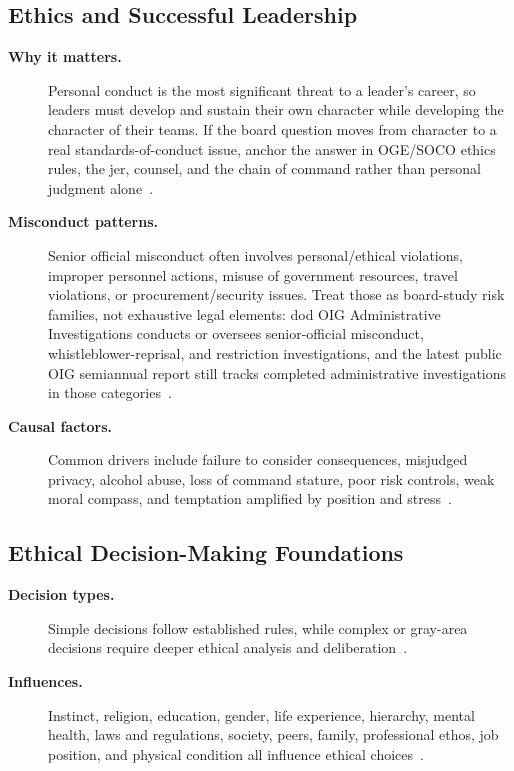 \documentclass[../main.tex]{subfiles}
\begin{document}
\subsection{Ethics and Successful Leadership}
\begin{description}
  \item[\textbf{Why it matters.}] Personal conduct is the most significant threat to a leader's career, so leaders must develop and sustain their own character while developing the character of their teams. If the board question moves from character to a real standards-of-conduct issue, anchor the answer in OGE/SOCO ethics rules, the \ac{jer}, counsel, and the chain of command rather than personal judgment alone~\autocite{edo-5-1-3-ethics-and-acquisition-2025,DoD-SOCO-Ethics-Laws-Regulations-2026,DoD-JER-2024}.
  \item[\textbf{Misconduct patterns.}] Senior official misconduct often involves personal/ethical violations, improper personnel actions, misuse of government resources, travel violations, or procurement/security issues. Treat those as board-study risk families, not exhaustive legal elements: \ac{dod} OIG Administrative Investigations conducts or oversees senior-official misconduct, whistleblower-reprisal, and restriction investigations, and the latest public OIG semiannual report still tracks completed administrative investigations in those categories~\autocite{edo-5-1-3-ethics-and-acquisition-2025,DoW-OIG-Admin-Investigations-2026,DoW-OIG-SAR-Oct2025-Mar2026-2026}.
  \item[\textbf{Causal factors.}] Common drivers include failure to consider consequences, misjudged privacy, alcohol abuse, loss of command stature, poor risk controls, weak moral compass, and temptation amplified by position and stress~\autocite{edo-5-1-3-ethics-and-acquisition-2025}.
\end{description}

\subsection{Ethical Decision-Making Foundations}
\begin{description}
  \item[\textbf{Decision types.}] Simple decisions follow established rules, while complex or gray-area decisions require deeper ethical analysis and deliberation~\autocite{edo-5-1-3-ethics-and-acquisition-2025}.
  \item[\textbf{Influences.}] Instinct, religion, education, gender, life experience, hierarchy, mental health, laws and regulations, society, peers, family, professional ethos, job position, and physical condition all influence ethical choices~\autocite{edo-5-1-3-ethics-and-acquisition-2025}.
\end{description}
\end{document}
